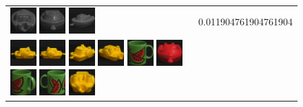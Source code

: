 \begin{figure}[tbp]
\begin{center}
\begin{tabular}{m{11cm} | m{3cm} |}
\includegraphics[width=1cm]{coil/beeld-26.eps}
\includegraphics[width=1cm]{coil/beeld-28.eps}
\includegraphics[width=1cm]{coil/beeld-29.eps}
& {\scriptsize 0.011904761904761904}
\\
\includegraphics[width=1cm]{coil/beeld-12.eps}
\includegraphics[width=1cm]{coil/beeld-13.eps}
\includegraphics[width=1cm]{coil/beeld-15.eps}
\includegraphics[width=1cm]{coil/beeld-16.eps}
\includegraphics[width=1cm]{coil/beeld-30.eps}
\includegraphics[width=1cm]{coil/beeld-20.eps}
\includegraphics[width=1cm]{coil/beeld-34.eps}
\includegraphics[width=1cm]{coil/beeld-31.eps}
\includegraphics[width=1cm]{coil/beeld-17.eps}

\end{tabular}
\end{center}
\end{figure}
